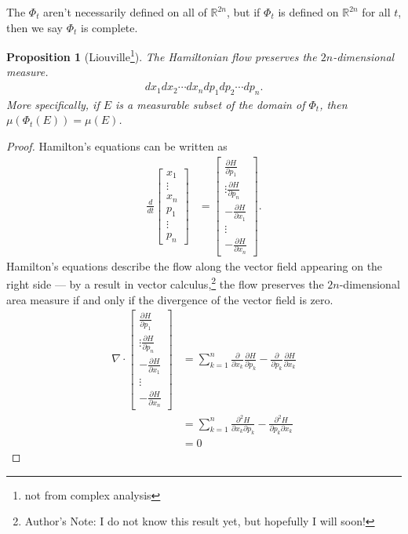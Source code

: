 \documentclass[12pt]{extarticle}
\newcommand{\R}{\mathbb{R}}
\theoremstyle{plain}
\newtheorem*{proposition}{Proposition}%
\theoremstyle{definition}
\theoremstyle{remark}
\begin{document}
  The $\Phi_t$ aren't necessarily defined on all of $\R^{2n}$, but if $\Phi_t$ is defined on $\R^{2n}$ for all $t$, then we say $\Phi_t$ is complete.
  \begin{proposition}[Liouville\footnote{not from complex analysis}]
    The Hamiltonian flow preserves the $2n$-dimensional measure.
    \begin{align*}
      dx_1 dx_2 \cdots dx_n dp_1 dp_2 \cdots dp_n.
    \end{align*}
    More specifically, if $E$ is a measurable subset of the domain of $\Phi_t$, then $\mu\left(\Phi_t(E)\right) = \mu(E)$.
  \end{proposition}
  \begin{proof}
    Hamilton's equations can be written as
        \begin{align*}
          \frac{d}{dt} \begin{bmatrix}x_1\\\vdots\\x_n\\p_1\\\vdots\\p_n\end{bmatrix} &= \begin{bmatrix}\frac{\partial H}{\partial p_1}\\\vdots \frac{\partial H}{\partial p_n}\\-\frac{\partial H}{\partial x_1}\\\vdots\\-\frac{\partial H}{\partial x_n}\end{bmatrix}.
        \end{align*}
        Hamilton's equations describe the flow along the vector field appearing on the right side --- by a result in vector calculus,\footnote{Author's Note: I do not know this result yet, but hopefully I will soon!} the flow preserves the $2n$-dimensional area measure if and only if the divergence of the vector field is zero.
        \begin{align*}
          \nabla \cdot \begin{bmatrix}\frac{\partial H}{\partial p_1}\\\vdots \frac{\partial H}{\partial p_n}\\-\frac{\partial H}{\partial x_1}\\\vdots\\-\frac{\partial H}{\partial x_n}\end{bmatrix} &= \sum_{k=1}^{n}\frac{\partial}{\partial x_k}\frac{\partial H}{\partial p_{k}} - \frac{\partial}{\partial p_k}\frac{\partial H}{\partial x_{k}}\\
         &= \sum_{k=1}^{n}\frac{\partial^{2} H}{\partial x_k \partial p_k} - \frac{\partial^2 H}{\partial p_k\partial x_k}\\
          &= 0
        \end{align*}
  \end{proof}
\end{document}
